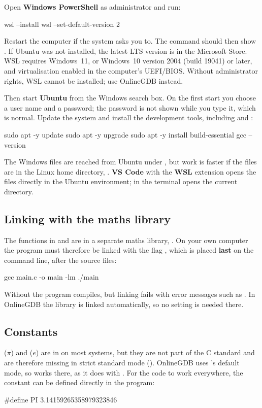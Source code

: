 Open \textbf{Windows PowerShell} as administrator and run:
\begin{shell}
wsl --install
wsl --set-default-version 2
\end{shell}
Restart the computer if the system asks you to. The command  should then show
. If Ubuntu was not installed, the latest LTS version is in the Microsoft
Store. WSL requires Windows~11, or Windows~10 version 2004 (build 19041) or later, and
virtualisation enabled in the computer's UEFI/BIOS. Without administrator rights, WSL cannot be
installed; use OnlineGDB instead.

Then start \textbf{Ubuntu} from the Windows search box. On the first start you choose a user name
and a password; the password is not shown while you type it, which is normal. Update the system
and install the development tools, including  and :
\begin{shell}
sudo apt -y update
sudo apt -y upgrade
sudo apt -y install build-essential
gcc --version
\end{shell}
The Windows files are reached from Ubuntu under , but work is faster if the files
are in the Linux home directory, \code{~}. \textbf{VS Code} with the \textbf{WSL} extension opens
the files directly in the Ubuntu environment;  in the terminal opens the current
directory.

\subsection{Linking with the maths library}
\label{c18:sec:lankning}
The functions in  and  are in a separate maths library, .
On your own computer the program must therefore be linked with the flag , which is
placed \textbf{last} on the command line, after the source files:
\begin{shell}
gcc main.c -o main -lm
./main
\end{shell}
Without  the program compiles, but linking fails with error messages such as
. In OnlineGDB the library is linked automatically, so no
setting is needed there.

\subsection{Constants}
\label{c18:sec:konstanter}
 ($\pi$) and  ($e$) are in  on most systems, but they are not
part of the C standard and are therefore missing in strict standard mode ().
OnlineGDB uses 's default mode, so  works there, as it does with
. For the code to work everywhere, the constant can be defined directly in the
program:
\begin{ccode}
#define PI 3.14159265358979323846
\end{ccode}

